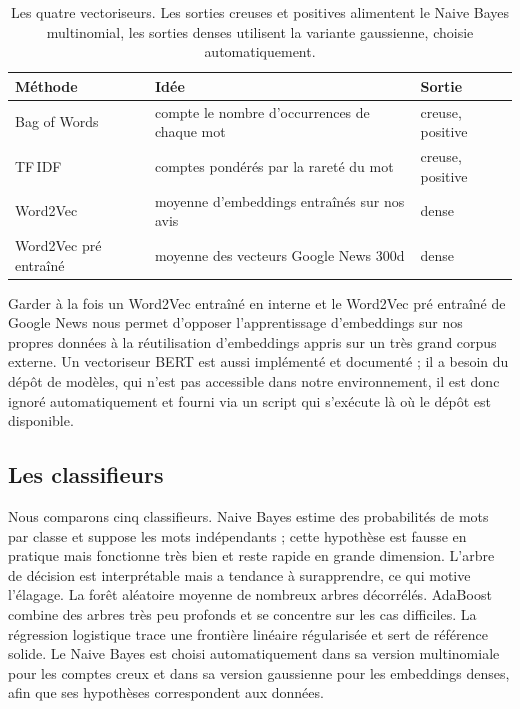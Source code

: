 \documentclass[11pt,a4paper]{article}
\begin{document}
\begin{table}[H]
\centering
\begin{tabular}{lll}
\toprule
\textbf{Méthode} & \textbf{Idée} & \textbf{Sortie} \\
\midrule
Bag of Words & compte le nombre d'occurrences de chaque mot & creuse, positive \\
TF\,IDF & comptes pondérés par la rareté du mot & creuse, positive \\
Word2Vec & moyenne d'embeddings entraînés sur nos avis & dense \\
Word2Vec pré entraîné & moyenne des vecteurs Google News 300d & dense \\
\bottomrule
\end{tabular}
\caption{Les quatre vectoriseurs. Les sorties creuses et positives alimentent le Naive
Bayes multinomial, les sorties denses utilisent la variante gaussienne, choisie
automatiquement.}
\end{table}

Garder à la fois un Word2Vec entraîné en interne et le Word2Vec pré entraîné de Google
News nous permet d'opposer l'apprentissage d'embeddings sur nos propres données à la
réutilisation d'embeddings appris sur un très grand corpus externe. Un vectoriseur BERT
est aussi implémenté et documenté ; il a besoin du dépôt de modèles, qui n'est pas
accessible dans notre environnement, il est donc ignoré automatiquement et fourni via
un script qui s'exécute là où le dépôt est disponible.

\subsection{Les classifieurs}
Nous comparons cinq classifieurs. Naive Bayes estime des probabilités de mots par
classe et suppose les mots indépendants ; cette hypothèse est fausse en pratique mais
fonctionne très bien et reste rapide en grande dimension. L'arbre de décision est
interprétable mais a tendance à surapprendre, ce qui motive l'élagage. La forêt
aléatoire moyenne de nombreux arbres décorrélés. AdaBoost combine des arbres très peu
profonds et se concentre sur les cas difficiles. La régression logistique trace une
frontière linéaire régularisée et sert de référence solide. Le Naive Bayes est choisi
automatiquement dans sa version multinomiale pour les comptes creux et dans sa version
gaussienne pour les embeddings denses, afin que ses hypothèses correspondent aux
données.

\end{document}
